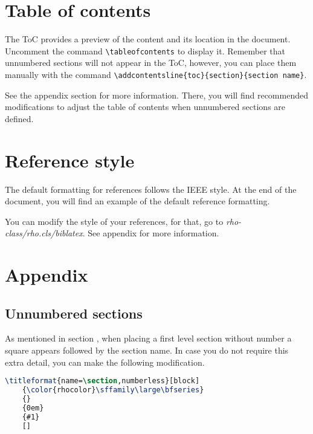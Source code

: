 \documentclass[9pt,a4paper,twoside]{rho-class/rho}
\begin{document}
\section{Table of contents}

    The ToC provides a preview of the content and its location in the document. Uncomment the command \verb|\tableofcontents| to display it. Remember that unnumbered sections will not appear in the ToC, however, you can place them manually with the command \verb|\addcontentsline{toc}{section}{section name}|.

    See the appendix section for more information. There, you will find recommended modifications to adjust the table of contents when unnumbered sections are defined.

\section{Reference style}

    The default formatting for references follows the IEEE style. At the end of the document, you will find an example of the default reference formatting.

    You can modify the style of your references, for that, go to \textit{rho-class/rho.cls/biblatex}. See appendix for more information.

\section{Appendix}

    \subsection{Unnumbered sections}

        As mentioned in section , when placing a first level section without number a square appears followed by the section name. In case you do not require this extra detail, you can make the following modification.

\nolinenumbers
\begin{lstlisting}[language=TeX, caption=Alternative unnumbered section.]
\titleformat{name=\section,numberless}[block]
    {\color{rhocolor}\sffamily\large\bfseries}
    {}
    {0em}
    {#1}
    []
\end{lstlisting}
\linenumbers
\end{document}
